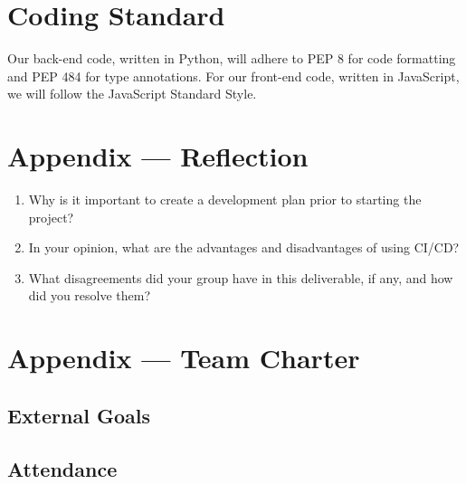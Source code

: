 \documentclass{article}
\begin{document}
\section{Coding Standard}
Our back-end code, written in Python, will adhere to PEP 8 for code formatting and PEP 484 for type annotations. 
For our front-end code, written in JavaScript, we will follow the JavaScript Standard Style.

\newpage{}

\section*{Appendix --- Reflection}




\begin{enumerate}
    \item Why is it important to create a development plan prior to starting the
    project?
    \item In your opinion, what are the advantages and disadvantages of using
    CI/CD?
    \item What disagreements did your group have in this deliverable, if any,
    and how did you resolve them?
\end{enumerate}

\newpage{}

\section*{Appendix --- Team Charter}


\subsection*{External Goals}


\subsection*{Attendance}
\end{document}
